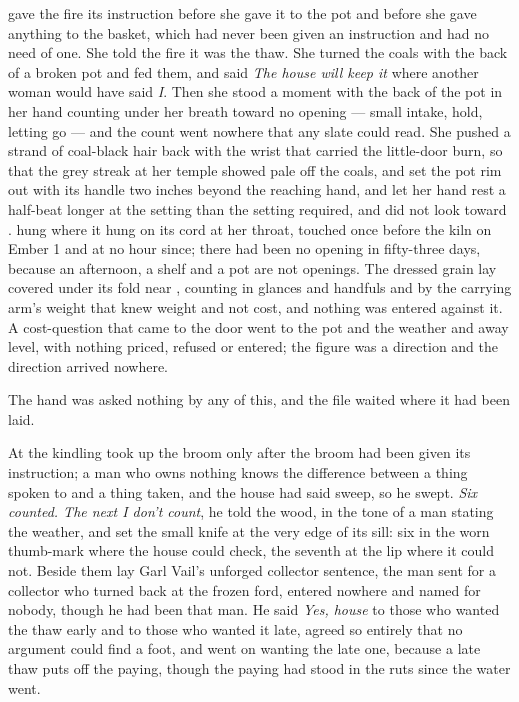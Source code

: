 \scenebreak

 gave the fire its instruction before she gave it to the pot and before she gave anything to the basket, which had never been given an instruction and had no need of one. She told the fire it was the thaw. She turned the coals with the back of a broken pot and fed them, and said \emph{The house will keep it} where another woman would have said \emph{I}. Then she stood a moment with the back of the pot in her hand counting under her breath toward no opening --- small intake, hold, letting go --- and the count went nowhere that any slate could read. She pushed a strand of coal-black hair back with the wrist that carried the little-door burn, so that the grey streak at her temple showed pale off the coals, and set the pot rim out with its handle two inches beyond the reaching hand, and let her hand rest a half-beat longer at the setting than the setting required, and did not look toward .  hung where it hung on its cord at her throat, touched once before the kiln on Ember 1 and at no hour since; there had been no opening in fifty-three days, because an afternoon, a shelf and a pot are not openings. The dressed grain lay covered under its fold near , counting in glances and handfuls and by the carrying arm's weight that knew weight and not cost, and nothing was entered against it. A cost-question that came to the door went to the pot and the weather and away level, with nothing priced, refused or entered; the figure was a direction and the direction arrived nowhere.

The hand was asked nothing by any of this, and the file waited where it had been laid.

\scenebreak

At the kindling  took up the broom only after the broom had been given its instruction; a man who owns nothing knows the difference between a thing spoken to and a thing taken, and the house had said sweep, so he swept. \emph{Six counted. The next I don't count}, he told the wood, in the tone of a man stating the weather, and set the small knife at the very edge of its sill: six in the worn thumb-mark where the house could check, the seventh at the lip where it could not. Beside them lay Garl Vail's unforged collector sentence, the man sent for a collector who turned back at the frozen ford, entered nowhere and named for nobody, though he had been that man. He said \emph{Yes, house} to those who wanted the thaw early and to those who wanted it late, agreed so entirely that no argument could find a foot, and went on wanting the late one, because a late thaw puts off the paying, though the paying had stood in the ruts since the water went.

